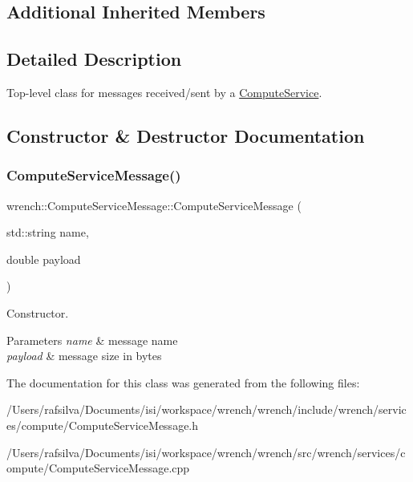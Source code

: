 \subsection*{Additional Inherited Members}


\subsection{Detailed Description}
Top-\/level class for messages received/sent by a \hyperlink{classwrench_1_1_compute_service}{Compute\+Service}. 

\subsection{Constructor \& Destructor Documentation}
\mbox{\label{classwrench_1_1_compute_service_message_a73dec6bc723dea40a67b0933fa115a0f}} 
\subsubsection{\texorpdfstring{Compute\+Service\+Message()}{ComputeServiceMessage()}}
{\footnotesize\ttfamily wrench\+::\+Compute\+Service\+Message\+::\+Compute\+Service\+Message (\begin{DoxyParamCaption}\item[{std\+::string}]{name,  }\item[{double}]{payload }\end{DoxyParamCaption})\hspace{0.3cm}{\ttfamily [protected]}}



Constructor. 


\begin{DoxyParams}{Parameters}
{\em name} & message name \\
\hline
{\em payload} & message size in bytes \\
\hline
\end{DoxyParams}


The documentation for this class was generated from the following files\+:\begin{DoxyCompactItemize}
\item 
/\+Users/rafsilva/\+Documents/isi/workspace/wrench/wrench/include/wrench/services/compute/Compute\+Service\+Message.\+h\item 
/\+Users/rafsilva/\+Documents/isi/workspace/wrench/wrench/src/wrench/services/compute/Compute\+Service\+Message.\+cpp\end{DoxyCompactItemize}
